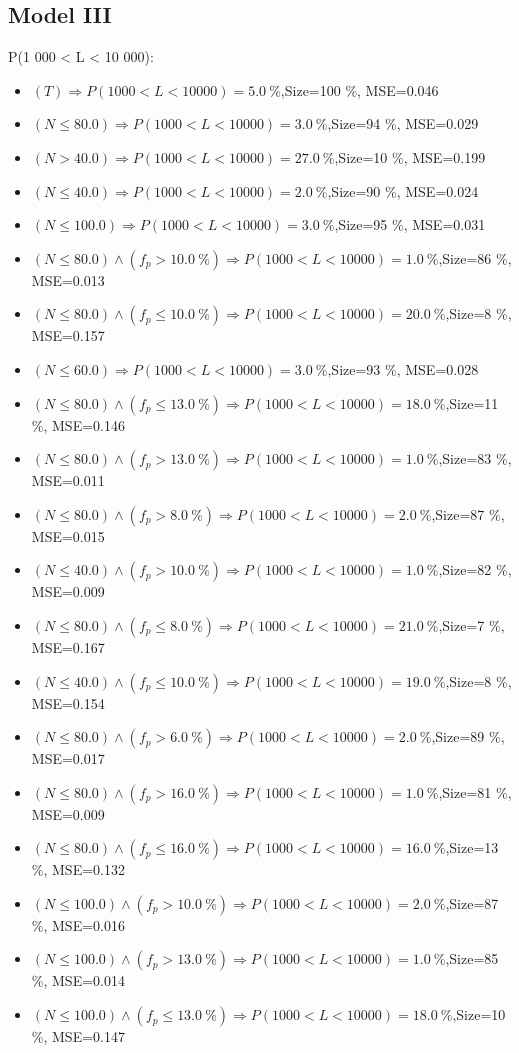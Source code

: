 \documentclass[numbered]{CSL}
\begin{document}
\subsection{Model III}
P(1 000 < L < 10 000):
\begin{itemize}
\item $(T) \Rightarrow P(1 000 < L < 10 000) = 5.0~\%$,\hfill Size=100 \%, MSE=0.046
\item $(N \leq 80.0) \Rightarrow P(1 000 < L < 10 000) = 3.0~\%$,\hfill Size=94 \%, MSE=0.029
\item $(N > 40.0) \Rightarrow P(1 000 < L < 10 000) = 27.0~\%$,\hfill Size=10 \%, MSE=0.199
\item $(N \leq 40.0) \Rightarrow P(1 000 < L < 10 000) = 2.0~\%$,\hfill Size=90 \%, MSE=0.024
\item $(N \leq 100.0) \Rightarrow P(1 000 < L < 10 000) = 3.0~\%$,\hfill Size=95 \%, MSE=0.031
\item $(N \leq 80.0) \land (f_p > 10.0~\%) \Rightarrow P(1 000 < L < 10 000) = 1.0~\%$,\hfill Size=86 \%, MSE=0.013
\item $(N \leq 80.0) \land (f_p \leq 10.0~\%) \Rightarrow P(1 000 < L < 10 000) = 20.0~\%$,\hfill Size=8 \%, MSE=0.157
\item $(N \leq 60.0) \Rightarrow P(1 000 < L < 10 000) = 3.0~\%$,\hfill Size=93 \%, MSE=0.028
\item $(N \leq 80.0) \land (f_p \leq 13.0~\%) \Rightarrow P(1 000 < L < 10 000) = 18.0~\%$,\hfill Size=11 \%, MSE=0.146
\item $(N \leq 80.0) \land (f_p > 13.0~\%) \Rightarrow P(1 000 < L < 10 000) = 1.0~\%$,\hfill Size=83 \%, MSE=0.011
\item $(N \leq 80.0) \land (f_p > 8.0~\%) \Rightarrow P(1 000 < L < 10 000) = 2.0~\%$,\hfill Size=87 \%, MSE=0.015
\item $(N \leq 40.0) \land (f_p > 10.0~\%) \Rightarrow P(1 000 < L < 10 000) = 1.0~\%$,\hfill Size=82 \%, MSE=0.009
\item $(N \leq 80.0) \land (f_p \leq 8.0~\%) \Rightarrow P(1 000 < L < 10 000) = 21.0~\%$,\hfill Size=7 \%, MSE=0.167
\item $(N \leq 40.0) \land (f_p \leq 10.0~\%) \Rightarrow P(1 000 < L < 10 000) = 19.0~\%$,\hfill Size=8 \%, MSE=0.154
\item $(N \leq 80.0) \land (f_p > 6.0~\%) \Rightarrow P(1 000 < L < 10 000) = 2.0~\%$,\hfill Size=89 \%, MSE=0.017
\item $(N \leq 80.0) \land (f_p > 16.0~\%) \Rightarrow P(1 000 < L < 10 000) = 1.0~\%$,\hfill Size=81 \%, MSE=0.009
\item $(N \leq 80.0) \land (f_p \leq 16.0~\%) \Rightarrow P(1 000 < L < 10 000) = 16.0~\%$,\hfill Size=13 \%, MSE=0.132
\item $(N \leq 100.0) \land (f_p > 10.0~\%) \Rightarrow P(1 000 < L < 10 000) = 2.0~\%$,\hfill Size=87 \%, MSE=0.016
\item $(N \leq 100.0) \land (f_p > 13.0~\%) \Rightarrow P(1 000 < L < 10 000) = 1.0~\%$,\hfill Size=85 \%, MSE=0.014
\item $(N \leq 100.0) \land (f_p \leq 13.0~\%) \Rightarrow P(1 000 < L < 10 000) = 18.0~\%$,\hfill Size=10 \%, MSE=0.147
\end{itemize}
\end{document}
